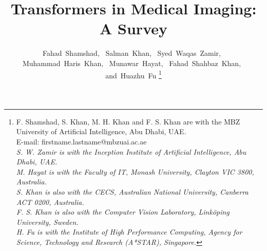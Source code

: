 \documentclass[10pt,journal,compsoc]{IEEEtran}
\begin{document}
\title{Transformers in Medical Imaging: A Survey}

\author{\textsf{ Fahad~Shamshad,~%
        Salman~Khan,~%
        Syed~Waqas~Zamir,~%
        Muhammad~Haris~Khan,~\linebreak%
        Munawar~Hayat,~%
        Fahad~Shahbaz~Khan,~%
        and~Huazhu~Fu}%
\thanks{F. Shamshad, S. Khan, M. H. Khan and F. S. Khan are with the MBZ University of Artificial Intelligence, Abu Dhabi, UAE.\\
E-mail: firstname.lastname@mbzuai.ac.ae \\
\textit{S. W. Zamir is with the Inception Institute of Artificial Intelligence, Abu Dhabi, UAE.} \\
\textit{M. Hayat is with the Faculty of IT, Monash University, Clayton VIC 3800, Australia.}\\
\textit{S. Khan is also with the CECS, Australian National University, Canberra ACT 0200, Australia.} \\
\textit{F. S. Khan is also with the Computer Vision Laboratory, Linköping University, Sweden. }\\
\textit{H. Fu is with the Institute of High Performance Computing, Agency for Science, Technology and Research (A*STAR), Singapore.}
% 
}%
}
\end{document}
